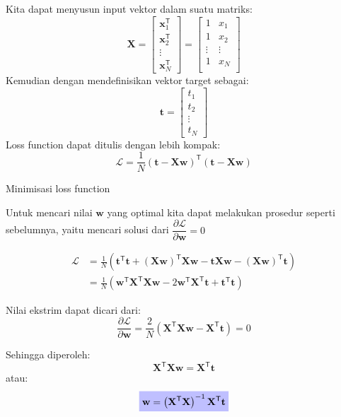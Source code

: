 \documentclass[a4paper,12pt]{article} %
\newcommand{\highlighteq}[1]{\colorbox{blue!25}{$\displaystyle#1$}}
\begin{document}
Kita dapat menyusun input vektor dalam suatu matriks:
$$
\mathbf{X} = \begin{bmatrix}
\mathbf{x}^{\mathsf{T}}_{1} \\
\mathbf{x}^{\mathsf{T}}_{2} \\
\vdots \\
\mathbf{x}^{\mathsf{T}}_{N}
\end{bmatrix} =
\begin{bmatrix}
1 & x_{1} \\
1 & x_{2} \\
\vdots & \vdots \\
1 & x_{N} \\
\end{bmatrix}
$$
%
Kemudian dengan mendefinisikan vektor target sebagai:
$$
\mathbf{t} = \begin{bmatrix}
t_1 \\
t_2 \\
\vdots \\
t_N
\end{bmatrix}
$$
%
Loss function dapat ditulis dengan lebih kompak:
$$
\mathcal{L} = \frac{1}{N} \left( \mathbf{t} - \mathbf{Xw} \right)^{\mathsf{T}}
\left( \mathbf{t} - \mathbf{Xw} \right)
$$

Minimisasi loss function

Untuk mencari nilai $\mathbf{w}$ yang optimal kita dapat melakukan prosedur
seperti sebelumnya, yaitu mencari solusi dari $\dfrac{\partial \mathcal{L}}{\partial \mathbf{w}} = 0$

\begin{align}
\mathcal{L} & = \frac{1}{N} \left(
\mathbf{t}^{\mathsf{T}} \mathbf{t} +
\left(\mathbf{Xw}\right)^{\mathsf{T}} \mathbf{Xw} -
\mathbf{t}\mathbf{Xw} -
\left(\mathbf{Xw}\right)^{\mathsf{T}} \mathbf{t}
\right) \\
& = \frac{1}{N} \left(
\mathbf{w}^{\mathsf{T}} \mathbf{X}^{\mathsf{T}} \mathbf{X} \mathbf{w} -
2 \mathbf{w}^{\mathsf{T}} \mathbf{X}^{\mathsf{T}}\mathbf{t} +
\mathbf{t}^{\mathsf{T}} \mathbf{t}
\right)
\end{align}

Nilai ekstrim dapat dicari dari:
$$
\frac{\partial \mathcal{L}}{\partial \mathbf{w}} =
\frac{2}{N} \left( \mathbf{X}^{\mathsf{T}} \mathbf{Xw} - \mathbf{X}^{\mathsf{T}}\mathbf{t} \right) = 0
$$

Sehingga diperoleh:
\begin{equation}
\mathbf{X}^{\mathsf{T}} \mathbf{Xw} = \mathbf{X}^{\mathsf{T}} \mathbf{t}
\end{equation}
atau:
\begin{equation}
\highlighteq{
\mathbf{w} = \left(\mathbf{X}^{\mathsf{T}}\mathbf{X} \right)^{-1} \mathbf{X}^{\mathsf{T}} \mathbf{t}
}
\label{eq:w_vektor}
\end{equation}
\end{document}
